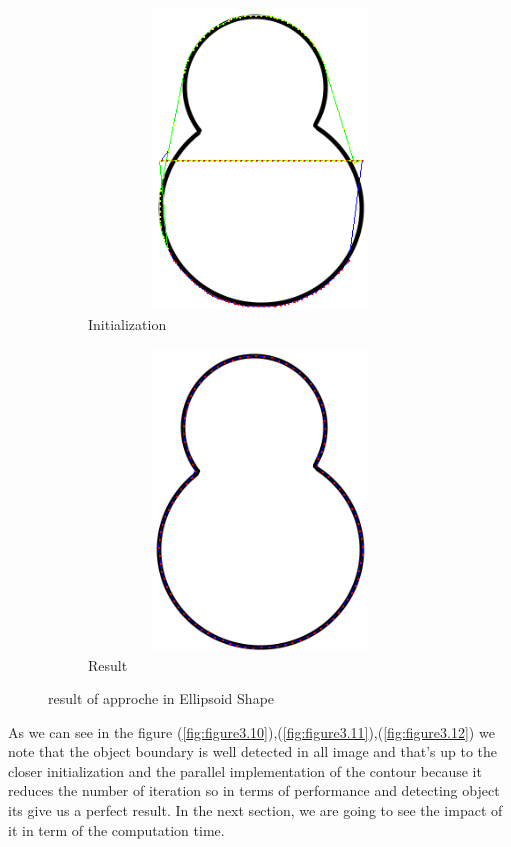 \begin{figure}[H]\ContinuedFloat
    \begin{subfigure}[b]{1\textwidth}
        \centering
        \includegraphics[width=12cm,height=8cm]{chapiter3/figures/figure 13 b.png}
        \caption{Initialization}
    \end{subfigure}
    \hfill
    \begin{subfigure}[b]{1\textwidth}
        \centering
        \includegraphics[width=12cm,height=8cm]{chapiter3/figures/figure 13 c.png}
        \caption{Result}
    \end{subfigure}
    \caption{result of approche in Ellipsoid Shape}
    \label{fig:figure3.12.1}
\end{figure}

\hspace{-0.6cm}As we can see in the figure (\ref{fig:figure3.10}),(\ref{fig:figure3.11}),(\ref{fig:figure3.12}) 
we note that the object boundary is well
detected in all image and that's up to the closer initialization and the parallel
implementation of the contour because it reduces the number of iteration so in
terms of performance and detecting object its give us a perfect result. In the next
section, we are going to see the impact of it in term of the computation time.

